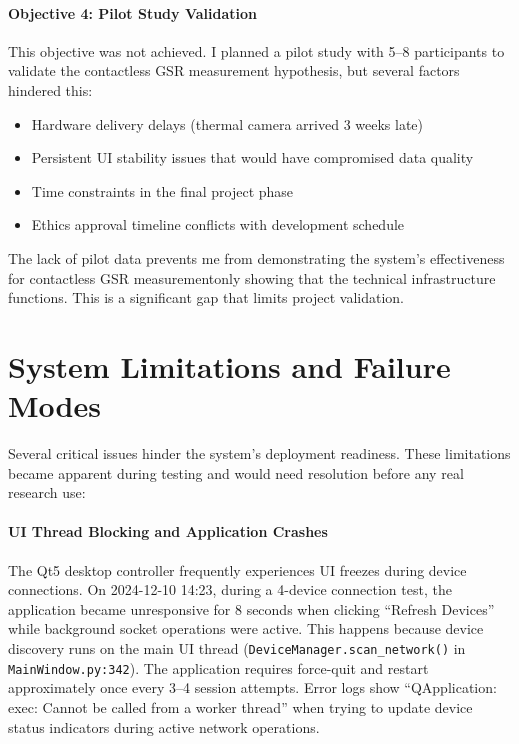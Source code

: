 \paragraph{\textbf{Objective 4: Pilot Study Validation}} This objective was not achieved. I planned a pilot study with 5--8 participants to validate the contactless GSR measurement hypothesis, but several factors hindered this:
\begin{itemize}
    \item Hardware delivery delays (thermal camera arrived 3 weeks late)
    \item Persistent UI stability issues that would have compromised data quality
    \item Time constraints in the final project phase
    \item Ethics approval timeline conflicts with development schedule
\end{itemize}
The lack of pilot data prevents me from demonstrating the system's effectiveness for contactless GSR measurement\textemdash only showing that the technical infrastructure functions. This is a significant gap that limits project validation.


\section{System Limitations and Failure Modes}

Several critical issues hinder the system's deployment readiness. These limitations became apparent during testing and would need resolution before any real research use:

\paragraph{\textbf{UI Thread Blocking and Application Crashes}} The Qt5 desktop controller frequently experiences UI freezes during device connections. On 2024-12-10 14:23, during a 4-device connection test, the application became unresponsive for 8 seconds when clicking ``Refresh Devices'' while background socket operations were active. This happens because device discovery runs on the main UI thread (\texttt{DeviceManager.scan\_network()} in \texttt{MainWindow.py:342}). The application requires force-quit and restart approximately once every 3--4 session attempts. Error logs show ``QApplication: exec: Cannot be called from a worker thread'' when trying to update device status indicators during active network operations.
